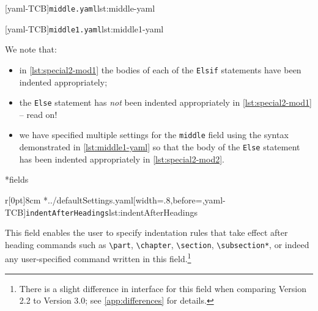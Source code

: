 	\begin{minipage}{.4\linewidth}
		[yaml-TCB]{\texttt{middle.yaml}}{lst:middle-yaml}
	\end{minipage}
	\hfill
	\begin{minipage}{.5\linewidth}
	\end{minipage}

	\begin{minipage}{.4\linewidth}
		[yaml-TCB]{\texttt{middle1.yaml}}{lst:middle1-yaml}
	\end{minipage}
	\hfill
	\begin{minipage}{.5\linewidth}
	\end{minipage}

	We note that:
	\begin{itemize}
		\item in \cref{lst:special2-mod1} the bodies of each of the \texttt{Elsif} statements have been indented appropriately;
		\item the \texttt{Else} statement has \emph{not} been indented appropriately in \cref{lst:special2-mod1} -- read on!
		\item we have specified multiple settings for the \texttt{middle} field using the syntax demonstrated in
		      \cref{lst:middle1-yaml} so that the body of the \texttt{Else} statement has been indented appropriately in \cref{lst:special2-mod2}.
	\end{itemize}

*{fields}
	\begin{wrapfigure}[17]{r}[0pt]{8cm}
		\cmhlistingsfromfile[style=indentAfterHeadings]*{../defaultSettings.yaml}[width=.8\linewidth,before=\centering,yaml-TCB]{\texttt{indentAfterHeadings}}{lst:indentAfterHeadings}
	\end{wrapfigure}
	This field enables the user to specify
	indentation rules that take effect after heading commands such as \lstinline!\part!, \lstinline!\chapter!,
	\lstinline!\section!, \lstinline!\subsection*!, or indeed any user-specified command written in this field.\footnote{There is a slight
		difference in interface for this field when comparing Version 2.2 to Version 3.0; see \vref{app:differences} for details.}

